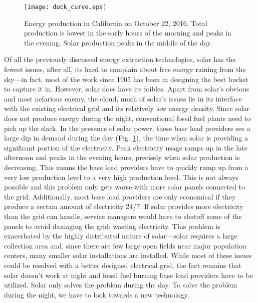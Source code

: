 \begin{figure}[ht]
    \centering
    \texttt{[image: duck\_curve.eps]}
    \caption{Energy production in California on October 22, 2016.\cite{caiso} Total production is lowest in the early hours of the morning and peaks in the evening. Solar production peaks in the middle of the day.}
    \label{fig:duck_curve}
\end{figure}
Of all the previously discussed energy extraction technologies, solar has the fewest issues, after all, its hard to complain about free energy raining from the sky---in fact, most of the work since 1905 has been in designing the best bucket to capture it in. However, solar does have its foibles. Apart from solar's obvious and most nefarious enemy, the cloud, much of solar's issues lie in its interface with the existing electrical grid and its relatively low energy density. Since solar does not produce energy during the night, conventional fossil fuel plants need to pick up the slack. In the presence of solar power, these base load providers see a large dip in demand during the day (Fig. \ref{fig:duck_curve}), the time when solar is providing a significant portion of the electricity. Peak electricity usage ramps up in the late afternoon and peaks in the evening hours, precisely when solar production is decreasing. This means the base load providers have to quickly ramp up from a very low production level to a very high production level. This is not always possible and this problem only gets worse with more solar panels connected to the grid. Additionally, most base load providers are only economical if they produce a certain amount of electricity 24/7. If solar provides more electricity than the grid can handle, service managers would have to shutoff some of the panels to avoid damaging the grid; wasting electricity. This problem is exacerbated by the highly distributed nature of solar---solar requires a large collection area and, since there are few large open fields near major population centers, many smaller solar installations are installed. While most of these issues could be resolved with a better designed electrical grid, the fact remains that solar doesn't work at night and fossil fuel burning base load providers have to be utilized. Solar only solves the problem during the day. To solve the problem during the night, we have to look towards a new technology. 

